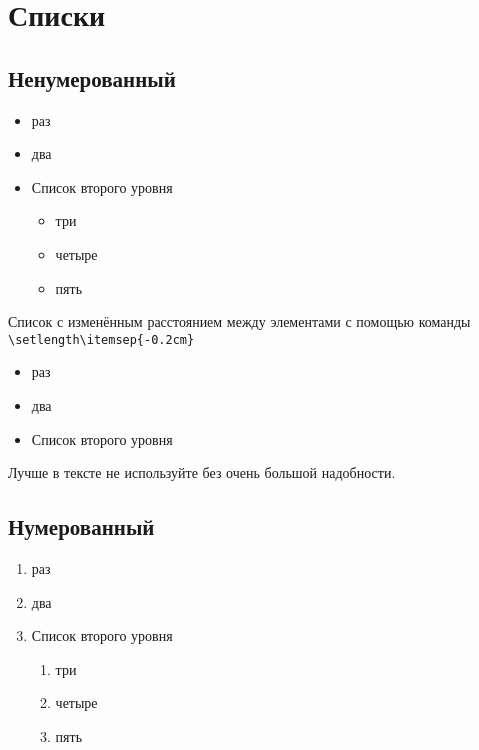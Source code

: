 \chapter{Списки}
\section{Ненумерованный}
\begin{itemize}
	\item раз
	\item два
	\item Список второго уровня
	\begin{itemize}
		\item три
		\item четыре
		\item пять
	\end{itemize}
\end{itemize}


Список с изменённым расстоянием между элементами с помощью команды \verb*|\setlength\itemsep{-0.2cm}| 
\begin{itemize}
	 \setlength\itemsep{-0.2cm}
	\item раз
	\item два
	\item Список второго уровня
\end{itemize}
Лучше в тексте не используйте без очень большой надобности.

\section{Нумерованный}
\begin{enumerate}
	\item раз
	\item два
	\item Список второго уровня
	\begin{enumerate}
		\item три
		\item четыре
		\item пять
	\end{enumerate}
\end{enumerate}